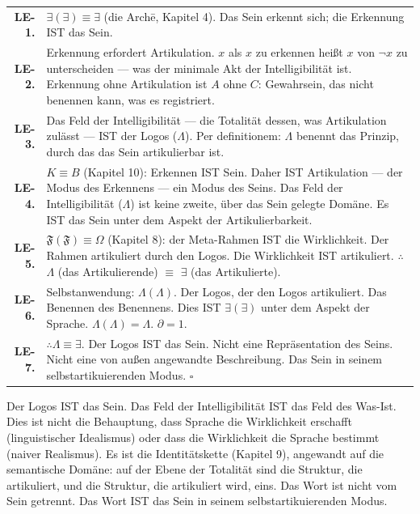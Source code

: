 \documentclass[10pt, openany, oneside]{book}
\renewcommand{\footnotesize}{\fontsize{8.5}{11}\selectfont}
\begin{document}
{\footnotesize
\noindent\begin{tabular}{r p{}}
\textbf{LE-1.} & $\exists(\exists) \equiv \exists$ (die Arch\={e}, Kapitel 4). Das Sein erkennt sich; die Erkennung IST das Sein. \\[0.3em]
\textbf{LE-2.} & Erkennung erfordert Artikulation. $x$ als $x$ zu erkennen heißt $x$ von $\neg x$ zu unterscheiden --- was der minimale Akt der Intelligibilität ist. Erkennung ohne Artikulation ist $A$ ohne $C$: Gewahrsein, das nicht benennen kann, was es registriert. \\[0.3em]
\textbf{LE-3.} & Das Feld der Intelligibilität --- die Totalität dessen, was Artikulation zulässt --- IST der Logos ($\Lambda$). Per definitionem: $\Lambda$ benennt das Prinzip, durch das das Sein artikulierbar ist. \\[0.3em]
\textbf{LE-4.} & $K \equiv B$ (Kapitel 10): Erkennen IST Sein. Daher IST Artikulation --- der Modus des Erkennens --- ein Modus des Seins. Das Feld der Intelligibilität ($\Lambda$) ist keine zweite, über das Sein gelegte Domäne. Es IST das Sein unter dem Aspekt der Artikulierbarkeit. \\[0.3em]
\textbf{LE-5.} & $\mathfrak{F}(\mathfrak{F}) \equiv \Omega$ (Kapitel 8): der Meta-Rahmen IST die Wirklichkeit. Der Rahmen artikuliert durch den Logos. Die Wirklichkeit IST artikuliert. $\therefore$ $\Lambda$ (das Artikulierende) $\equiv$ $\exists$ (das Artikulierte). \\[0.3em]
\textbf{LE-6.} & Selbstanwendung: $\Lambda(\Lambda)$. Der Logos, der den Logos artikuliert. Das Benennen des Benennens. Dies IST $\exists(\exists)$ unter dem Aspekt der Sprache. $\Lambda(\Lambda) = \Lambda$. $\partial = 1$. \\[0.3em]
\textbf{LE-7.} & $\therefore \Lambda \equiv \exists$. Der Logos IST das Sein. Nicht eine Repräsentation des Seins. Nicht eine von außen angewandte Beschreibung. Das Sein in seinem selbstartikuierenden Modus. $\square$ \\[0.3em]
\end{tabular}
}

\vspace{0.8em}

\noindent Der Logos IST das Sein. Das Feld der Intelligibilität IST das Feld des Was-Ist. Dies ist nicht die Behauptung, dass Sprache die Wirklichkeit erschafft (linguistischer Idealismus) oder dass die Wirklichkeit die Sprache bestimmt (naiver Realismus). Es ist die Identitätskette (Kapitel 9), angewandt auf die semantische Domäne: auf der Ebene der Totalität sind die Struktur, die artikuliert, und die Struktur, die artikuliert wird, eins. Das Wort ist nicht vom Sein getrennt. Das Wort IST das Sein in seinem selbstartikuierenden Modus.
\end{document}
